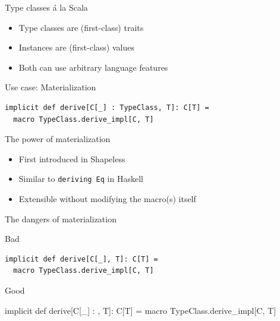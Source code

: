 \documentclass{beamer}
\newcommand\demoslide{
  {
    \setbeamertemplate{background}{}
    \begin{frame}[plain]
      \begin{center}\Large\bfseries Demo\end{center}
    \end{frame}
  }
}
\begin{document}
\begin{frame}{Type classes \'a la Scala}
  \begin{itemize}
    \item Type classes are (first-class) traits
    \item Instances are (first-class) values
    \item<visible@2> Both can use arbitrary language features
  \end{itemize}
\end{frame}

\begin{frame}[fragile]{Use case: Materialization}
  \begin{verbatim}
implicit def derive[C[_] : TypeClass, T]: C[T] =
  macro TypeClass.derive_impl[C, T]
  \end{verbatim}
\end{frame}


\begin{frame}{The power of materialization}
  \begin{itemize}
    \item First introduced in Shapeless
    \item Similar to \texttt{deriving Eq} in Haskell
    \item Extensible without modifying the macro(s) itself
  \end{itemize}
\end{frame}

\begin{frame}[fragile]{The dangers of materialization}
  \vspace{1em}
  \begin{alertblock}{Bad}
  \begin{verbatim}
implicit def derive[C[_], T]: C[T] =
  macro TypeClass.derive_impl[C, T]
  \end{verbatim}
  \end{alertblock}

  \vspace{1em}
  \begin{exampleblock}{Good}
  \begin{semiverbatim}
implicit def derive[C[_] : \text{\color{blue}{TypeClass}}, T]: C[T] =
  macro TypeClass.derive_impl[C, T]
  \end{semiverbatim}
  \end{exampleblock}
\end{frame}
\end{document}
